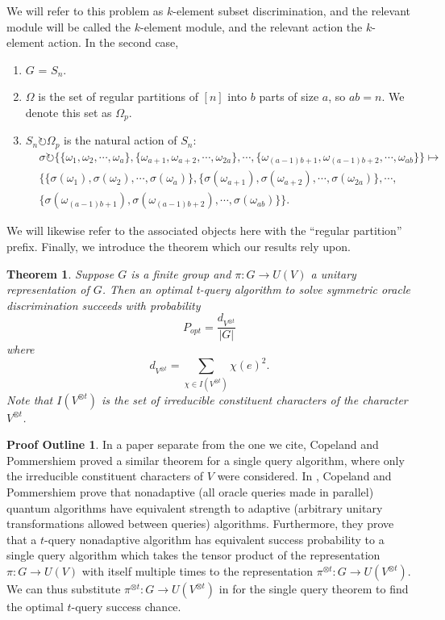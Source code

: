 \documentclass[12pt,twoside]{reedthesis}
\theoremstyle{plain}   %
\newtheorem{thm}{Theorem}[section] %
\theoremstyle{definition}
\newtheorem{outline}{Proof Outline}[section]
\theoremstyle{remark}
\numberwithin{equation}{section}
\def\acts{\circlearrowright} %
\begin{document}
  We will refer to this problem as $k$-element subset discrimination, and the relevant module will be called the $k$-element module, and the relevant action the $k$-element action.
  In the second case,
  \begin{enumerate}
  \item $G$ = $S_n$.
  \item $\Omega$ is the set of regular partitions of $[n]$ into $b$ parts of size $a$, so $ab = n$. We denote this set as $\Omega_p$.
  \item $S_n \acts \Omega_p$ is the natural action of $S_n$:
    \begin{align*}
      &\sigma \acts \{ \{ \omega_1, \omega_2, \cdots, \omega_a \}, \{ \omega_{a+1}, \omega_{a+2}, \cdots, \omega_{2a} \}, \cdots, \{ \omega_{(a-1)b + 1}, \omega_{(a-1)b + 2}, \cdots, \omega_{ab} \}  \} \mapsto &\\
      &\{ \{ \sigma(\omega_1), \sigma(\omega_2), \cdots, \sigma(\omega_a )\}, \{ \sigma(\omega_{a+1}), \sigma(\omega_{a+2}), \cdots, \sigma(\omega_{2a}) \}, \cdots, \\
      & \{ \sigma(\omega_{(a-1)b + 1}), \sigma(\omega_{(a-1)b + 2}), \cdots, \sigma(\omega_{ab}) \} \}.
    \end{align*}
  \end{enumerate}
  We will likewise refer to the associated objects here with the ``regular partition'' prefix.
  Finally, we introduce the theorem which our results rely upon.
  \begin{thm}
    Suppose $G$ is a finite group and $\pi : G \to U (V )$ a unitary representation of $G$. Then
    an optimal t-query algorithm to solve symmetric oracle discrimination succeeds with probability
    \[ P_{opt} = \dfrac{d_{V^{\otimes t}}}{|G|} \]
    where
    \[ d_{V^{\otimes t}} = \sum_{\chi \in I(V^{\otimes t})} \chi (e)^2.\]
    Note that $I(V^{\otimes t})$ is the set of irreducible constituent characters of the character $V^{\otimes t}$.
  \end{thm}
  \begin{outline}
    In a paper separate from the one we cite, Copeland and Pommershiem proved a similar theorem for a single query algorithm, where only the irreducible constituent characters of $V$ were considered.
    In \cite{copeland}, Copeland and Pommershiem prove that nonadaptive (all oracle queries made in parallel) quantum algorithms have equivalent strength to adaptive (arbitrary unitary transformations allowed between queries)
    algorithms.
    Furthermore, they prove that a $t$-query nonadaptive algorithm has equivalent success probability to a single query algorithm which takes the tensor product of the representation $\pi:G \to U(V)$ with itself multiple times to the
    representation $\pi^{\otimes t}:G \to U(V^{ \otimes t})$.
    We can thus substitute $\pi^{\otimes t}:G \to U(V^{ \otimes t})$ in for the single query theorem to find the optimal $t$-query success chance.
  \end{outline}
\end{document}
